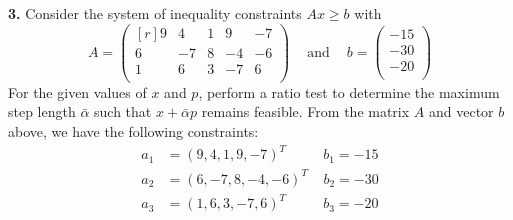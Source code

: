 \documentclass{article}
\begin{document}
    \textbf{3.} Consider the system of inequality constraints $Ax \geq b$ with
    \[A = \begin{pmatrix*}[r]
        9 & 4 & 1 & 9 & -7\\
        6 & -7 & 8 & -4 & -6\\
        1 & 6 & 3 & -7 & 6\\
    \end{pmatrix*}
    \:\:\:\: \text{ and } \:\:\:\: b = \begin{pmatrix}
        -15\\
        -30\\
        -20\\
    \end{pmatrix}
    \]
    For the given values of $x$ and $p$, perform a ratio test to determine the maximum step length $\bar{\alpha}$ such that $x + \bar{\alpha}p$ remains feasible.
    \newline\newline
    From the matrix $A$ and vector $b$ above, we have the following constraints:
    \begin{align*}
        a_1 &= (9,4,1,9,-7)^T \:\:\:\:\:\:\:\:\:\:\:\: b_1 = -15\\
        a_2 &= (6,-7,8,-4,-6)^T \:\:\:\:\: b_2 = -30\\
        a_3 &= (1,6,3,-7,6)^T \:\:\:\:\:\:\:\:\:\:\:\: b_3 = -20\\
    \end{align*}
\end{document}
